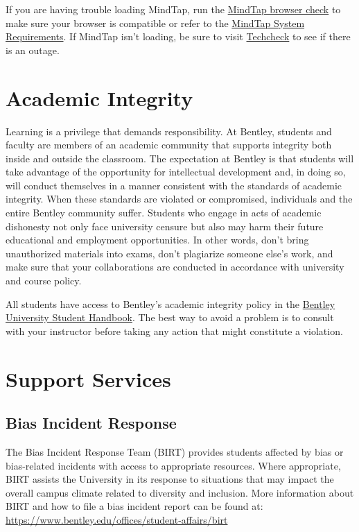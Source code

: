 \documentclass[11pt,letterpaper]{article}
\begin{document}
If you are having trouble loading MindTap, run the \href{https://ng.cengage.com/static/browsercheck/index.html}{MindTap browser check} to make sure your browser is compatible or refer to the \href{https://help.cengage.com/mindtap/MindTap-System-Requirements.pdf}{MindTap System Requirements}. If MindTap isn't loading, be sure to visit \href{https://techcheck.cengage.com}{Techcheck} to see if there is an outage.

\section*{Academic Integrity}

Learning is a privilege that demands responsibility. At Bentley, students and faculty are members of an academic community that supports integrity both inside and outside the classroom. The expectation at Bentley is that students will take advantage of the opportunity for intellectual development and, in doing so, will conduct themselves in a manner consistent with the standards of academic integrity. When these standards are violated or compromised, individuals and the entire Bentley community suffer. Students who engage in acts of academic dishonesty not only face university censure but also may harm their future educational and employment opportunities. In other words, don't bring unauthorized materials into exams, don't plagiarize someone else's work, and make sure that your collaborations are conducted in accordance with university and course policy.

All students have access to Bentley's academic integrity policy in the \href{https://bentleydownloads.s3.amazonaws.com/registrar/Bentley+University+Student+Handbook+2025-2026.pdf}{Bentley University Student Handbook}. The best way to avoid a problem is to consult with your instructor before taking any action that might constitute a violation.

\section*{Support Services}

\subsection*{Bias Incident Response}
The Bias Incident Response Team (BIRT) provides students affected by bias or bias-related incidents with access to appropriate resources. Where appropriate, BIRT assists the University in its response to situations that may impact the overall campus climate related to diversity and inclusion. More information about BIRT and how to file a bias incident report can be found at: \url{https://www.bentley.edu/offices/student-affairs/birt}
\end{document}
